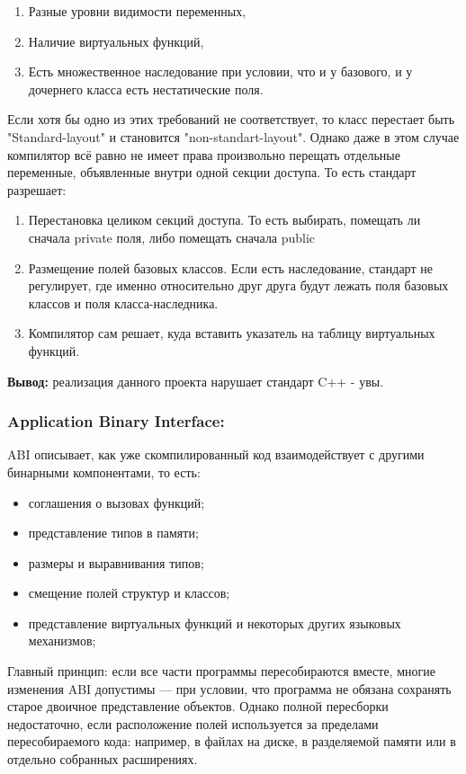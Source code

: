 \documentclass[a4paper,12pt]{article}
\begin{document}
\begin{enumerate}
    \item Разные уровни видимости переменных, 
    \item Наличие виртуальных функций, 
    \item Есть множественное наследование при условии, что и 
        у базового, и у дочернего класса есть нестатические поля.
\end{enumerate}

Если хотя бы одно из этих требований не соответствует, то класс перестает быть
"Standard-layout" и становится "non-standart-layout". Однако даже в этом случае
компилятор всё равно не имеет права произвольно перещать отдельные переменные,
объявленные внутри одной секции доступа. То есть стандарт разрешает:
\begin{enumerate}
    \item Перестановка целиком секций доступа. То есть выбирать, помещать ли
        сначала private поля, либо помещать сначала public
    \item Размещение полей базовых классов. Если есть наследование, стандарт не регулирует, 
        где именно относительно друг друга будут лежать поля базовых классов и 
        поля класса-наследника.
    \item Компилятор сам решает, куда вставить указатель на таблицу виртуальных
        функций. 
\end{enumerate}

\textbf{Вывод:} реализация данного проекта нарушает стандарт C++ - увы.

\subsubsection{Application Binary Interface:}
ABI описывает, как уже скомпилированный код взаимодействует с другими бинарными
компонентами, то есть:
\begin{itemize}
    \item соглашения о вызовах функций;
    \item представление типов в памяти;
    \item размеры и выравнивания типов;
    \item смещение полей структур и классов;
    \item представление виртуальных функций и некоторых других языковых механизмов;
\end{itemize}

Главный принцип: если все части программы пересобираются вместе, многие изменения ABI 
допустимы — при условии, что программа не обязана сохранять старое двоичное представление 
объектов. Однако полной пересборки недостаточно, если расположение полей используется 
за пределами пересобираемого кода: например, в файлах на диске, в разделяемой 
памяти или в отдельно собранных расширениях.
\end{document}
